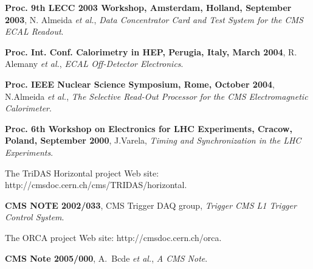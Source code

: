 \begin{thebibliography}{99}
 \textbf{Proc. 9th LECC 2003 Workshop, Amsterdam, Holland,
  September 2003}, N. Almeida \textit{et al.}, \textit{Data Concentrator Card and Test System for the CMS ECAL Readout}. 

 \textbf{Proc. Int. Conf. Calorimetry in HEP, Perugia,
  Italy, March 2004}, R. Alemany \textit{et al.}, \textit{ECAL Off-Detector Electronics}.

 \textbf{Proc. IEEE Nuclear Science Symposium, Rome, October
  2004}, N.Almeida \textit{et al.}, \textit{The Selective Read-Out Processor for the CMS Electromagnetic Calorimeter}.

 \textbf{Proc. 6th Workshop on Electronics for LHC
  Experiments, Cracow, Poland, September 2000}, J.Varela, \textit{Timing and Synchronization in the LHC Experiments}.

 The TriDAS Horizontal project Web site: http://cmsdoc.cern.ch/cms/TRIDAS/horizontal.

 \textbf{CMS NOTE 2002/033}, CMS Trigger DAQ group, \textit{Trigger CMS L1 Trigger Control System}.

 The ORCA project Web site: http://cmsdoc.cern.ch/orca.

 \textbf{CMS Note 2005/000},
  A.~Bcde \textit{et al.},
  \textit{A CMS Note}.

\end{thebibliography}


